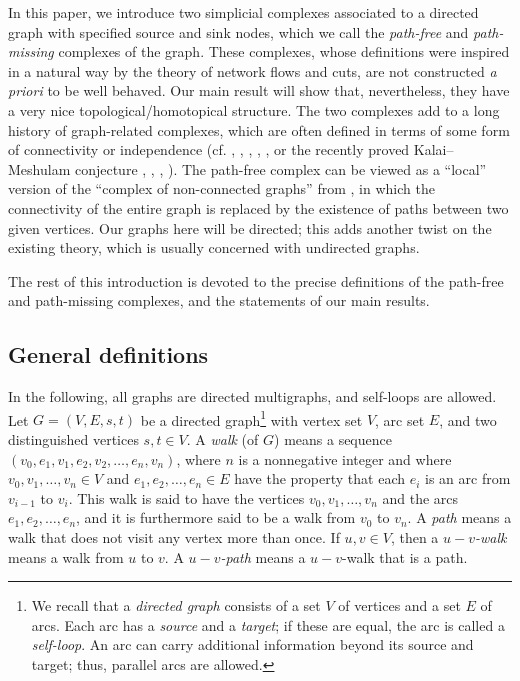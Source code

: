\documentclass[12pt]{amsart}
\newcommand\arxiv[1]{\href{http://www.arxiv.org/abs/#1}{\texttt{arXiv:#1}}}
\theoremstyle{definition}
\newcommand{\tup}[1]{\left( #1 \right)}
\begin{document}
In this paper, we introduce two simplicial complexes associated to a directed graph with specified source and sink nodes, which we call the \emph{path-free} and \emph{path-missing} complexes of the graph.
These complexes, whose definitions were inspired in a natural way by the theory of network flows and cuts, are not constructed \emph{a priori} to be well behaved.
Our main result will show that, nevertheless, they have a very nice topological/homotopical structure.
The two complexes add to a long history of graph-related complexes, which are often defined in terms of some form of connectivity or independence (cf. \cite{BDMRSX}, \cite[Section 5]{Forman-user}, \cite{Jonsson}, \cite{Kozlov-CAT}, \cite{EhrHet}, or the recently proved Kalai--Meshulam conjecture \cite{CSSS}, \cite{Engstrom20}, \cite{Kim22}, \cite{ZhangHu25}).
The path-free complex can be viewed as a ``local'' version of the ``complex of non-connected graphs'' from \cite[Section 5]{Forman-user}, in which the connectivity of the entire graph is replaced by the existence of paths between two given vertices. Our graphs here will be directed; this adds another twist on the existing theory, which is usually concerned with undirected graphs.

The rest of this introduction is devoted to the precise definitions of the path-free and path-missing complexes, and the statements of our main results.


\subsection{\label{sect.defs}General definitions}

In the following, all graphs are directed multigraphs, and self-loops are allowed.
Let $G = \tup{V,E, s,t}$ be a directed graph\footnote{We recall that a \emph{directed graph} consists of a set $V$ of vertices and a set $E$ of arcs. Each arc has a \emph{source} and a \emph{target}; if these are equal, the arc is called a \emph{self-loop}. An arc can carry additional information beyond its source and target; thus, parallel arcs are allowed.}
with vertex set $V$, arc set $E$, and two distinguished vertices $s,t \in V$.
A \emph{walk} (of $G$) means a sequence $\tup{v_0, e_1, v_1, e_2, v_2, \ldots, e_n, v_n}$, where $n$ is a nonnegative integer and where $v_0, v_1, \ldots, v_n \in V$ and $e_1, e_2, \ldots, e_n \in E$ have the property that each $e_i$ is an arc from $v_{i-1}$ to $v_i$.
This walk is said to have the vertices $v_0, v_1, \ldots, v_n$ and the arcs $e_1, e_2, \ldots, e_n$, and it is furthermore said to be a walk from $v_0$ to $v_n$.
A \emph{path} means a walk that does not visit any vertex more than once.
If $u, v \in V$, then a \emph{$u-v$-walk} means a walk from $u$ to $v$.
A \emph{$u-v$-path} means a $u-v$-walk that is a path.
\end{document}
